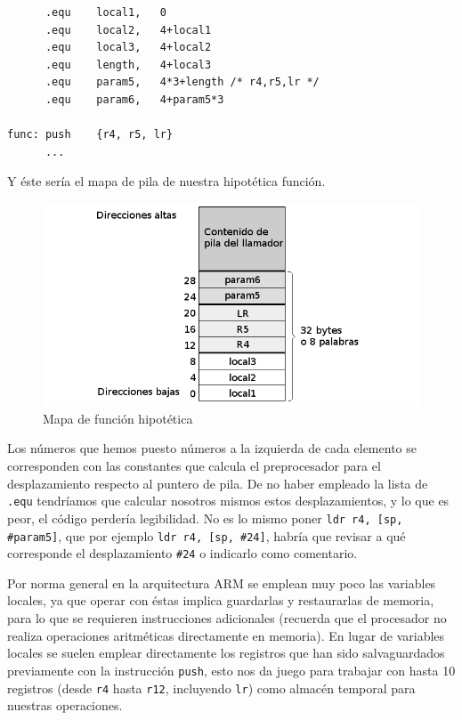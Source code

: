 \begin{lstlisting}
      .equ    local1,   0
      .equ    local2,   4+local1
      .equ    local3,   4+local2
      .equ    length,   4+local3
      .equ    param5,   4*3+length /* r4,r5,lr */
      .equ    param6,   4+param5*3

func: push    {r4, r5, lr}
      ...
\end{lstlisting}

Y éste sería el mapa de pila de nuestra hipotética función.

\begin{figure}[h]
  \centering
    \includegraphics[width=14cm]{graphs/pila4.png}
  \caption{Mapa de función hipotética}
  \label{fig:pila4}
\end{figure}

Los números que hemos puesto números a la izquierda de cada elemento se
corresponden con las constantes que calcula el preprocesador para el
desplazamiento respecto al puntero de pila. De no haber empleado la lista
de {\tt .equ} tendríamos que calcular nosotros mismos estos desplazamientos,
y lo que es peor, el código perdería legibilidad. No es lo mismo poner
{\tt ldr r4, [sp, \#param5]}, que por ejemplo {\tt ldr r4, [sp, \#24]}, habría
que revisar a qué corresponde el desplazamiento {\tt \#24} o indicarlo como
comentario.

Por norma general en la arquitectura ARM se emplean muy poco las variables
locales, ya que operar con éstas implica guardarlas y restaurarlas de memoria,
para lo que se requieren instrucciones adicionales (recuerda que el procesador
no realiza operaciones aritméticas directamente en memoria). En lugar de
variables locales se suelen emplear directamente los registros que han sido
salvaguardados previamente con la instrucción {\tt push}, esto nos da juego
para trabajar con hasta 10 registros (desde {\tt r4} hasta {\tt r12},
incluyendo {\tt lr}) como almacén temporal para nuestras operaciones.

